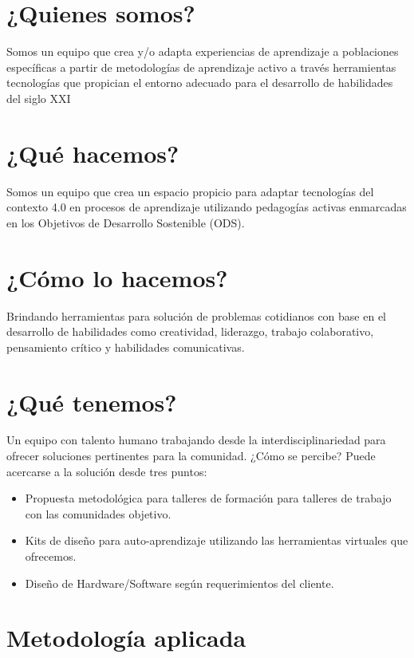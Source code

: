 \section*{¿Quienes somos?}

Somos un equipo que crea y/o adapta experiencias de aprendizaje a poblaciones específicas a partir de metodologías de aprendizaje activo a través herramientas tecnologías que propician el entorno adecuado para el desarrollo de habilidades del siglo XXI


\section*{¿Qué hacemos?}
Somos un equipo que crea un espacio propicio para adaptar tecnologías del contexto 4.0 en procesos de aprendizaje utilizando pedagogías activas enmarcadas en los Objetivos de Desarrollo Sostenible (ODS).



\section*{¿Cómo lo hacemos?}
Brindando herramientas para solución de problemas cotidianos con base en el desarrollo de habilidades como  creatividad, liderazgo, trabajo colaborativo,  pensamiento crítico y habilidades comunicativas.

\section*{¿Qué tenemos?}
Un equipo con talento humano trabajando desde la interdisciplinariedad para ofrecer soluciones pertinentes para la comunidad.
¿Cómo se percibe?
Puede acercarse a la solución desde tres puntos:
\begin{itemize}
  \item Propuesta metodológica para talleres de formación para talleres de trabajo con las comunidades objetivo.
  \item Kits de diseño para auto-aprendizaje utilizando las herramientas virtuales que ofrecemos. 
  \item Diseño de Hardware/Software según requerimientos del cliente.
\end{itemize}

\section*{Metodología aplicada}

